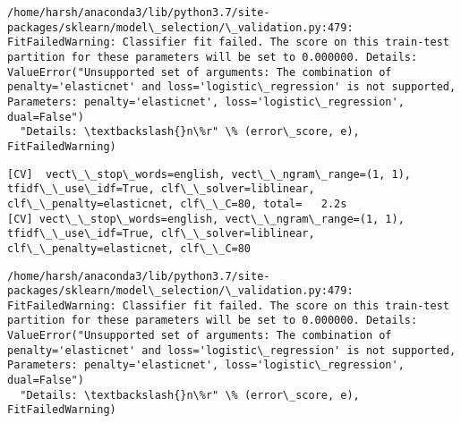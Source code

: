 \documentclass[11pt]{article}
\begin{document}
    \begin{Verbatim}[commandchars=\\\{\}]
/home/harsh/anaconda3/lib/python3.7/site-packages/sklearn/model\_selection/\_validation.py:479: FitFailedWarning: Classifier fit failed. The score on this train-test partition for these parameters will be set to 0.000000. Details: 
ValueError("Unsupported set of arguments: The combination of penalty='elasticnet' and loss='logistic\_regression' is not supported, Parameters: penalty='elasticnet', loss='logistic\_regression', dual=False")
  "Details: \textbackslash{}n\%r" \% (error\_score, e), FitFailedWarning)

    \end{Verbatim}

    \begin{Verbatim}[commandchars=\\\{\}]
[CV]  vect\_\_stop\_words=english, vect\_\_ngram\_range=(1, 1), tfidf\_\_use\_idf=True, clf\_\_solver=liblinear, clf\_\_penalty=elasticnet, clf\_\_C=80, total=   2.2s
[CV] vect\_\_stop\_words=english, vect\_\_ngram\_range=(1, 1), tfidf\_\_use\_idf=True, clf\_\_solver=liblinear, clf\_\_penalty=elasticnet, clf\_\_C=80 

    \end{Verbatim}

    \begin{Verbatim}[commandchars=\\\{\}]
/home/harsh/anaconda3/lib/python3.7/site-packages/sklearn/model\_selection/\_validation.py:479: FitFailedWarning: Classifier fit failed. The score on this train-test partition for these parameters will be set to 0.000000. Details: 
ValueError("Unsupported set of arguments: The combination of penalty='elasticnet' and loss='logistic\_regression' is not supported, Parameters: penalty='elasticnet', loss='logistic\_regression', dual=False")
  "Details: \textbackslash{}n\%r" \% (error\_score, e), FitFailedWarning)

    \end{Verbatim}
\end{document}
